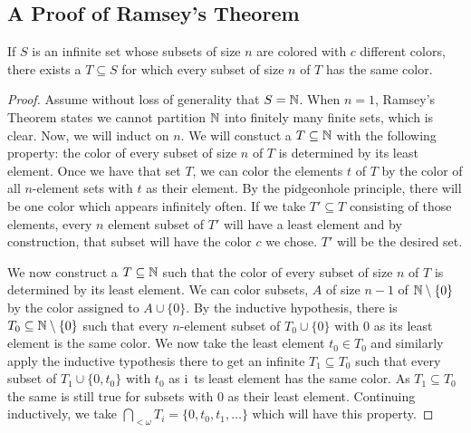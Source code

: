 \subsection{A Proof of Ramsey's Theorem}

\begin{theorem}\label{ramseys_theorem}
If \(S\) is an infinite set whose subsets of size \(n\) are colored with \(c\) different colors, there exists a \(T \subseteq S\) for which every subset of size \(n\) of \(T\) has the same color.
\end{theorem}

\begin{proof}
Assume without loss of generality that \(S = \mathbb{N}\).
When \(n=1\), Ramsey's Theorem states we cannot partition \(\mathbb{N}\) into finitely many finite sets, which is clear.
Now, we will induct on \(n\).
We will constuct a \(T \subseteq \mathbb{N}\) with the following property: the color of every subset of size \(n\) of \(T\) is determined by its least element.
Once we have that set \(T\), we can color the elements \(t\) of \(T\) by the color of all \(n\)-element sets with \(t\) as their element.
By the pidgeonhole principle, there will be one color which appears infinitely often.
If we take \(T' \subseteq T\) consisting of those elements, every \(n\) element subset of \(T'\) will have a least element and by construction, that subset will have the color \(c\) we chose.
\(T'\) will be the desired set.

We now construct a \(T \subseteq \mathbb{N}\) such that the color of every subset of size \(n\) of \(T\) is determined by its least element.
We can color subsets, \(A\) of size \(n-1\) of \(\mathbb{N} \setminus \{0\}\) by the color assigned to \(A \cup \{0\}\).
By the inductive hypothesis, there is \(T_0 \subseteq \mathbb{N} \setminus \{0\}\) such that every \(n\)-element subset of \(T_0 \cup \{0\}\) with 0 as its least element is the same color.
We now take the least element \(t_0 \in T_0\) and similarly apply the inductive typothesis there to get an infinite \(T_1 \subseteq T_0\) such that every subset of \(T_1 \cup \{0, t_0\}\) with \(t_0\) as i\
ts least element has the same color.
As \(T_1 \subseteq T_0\) the same is still true for subsets with \(0\) as their least element.
Continuing inductively, we take \(\bigcap_{<\omega}T_i = \{0, t_0, t_1, \ldots\}\) which will have this property.
\end{proof}



